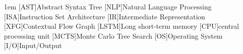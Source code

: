 \begin{acronym}[MCTS]\itemsep1em
    [AST]{Abstract Syntax Tree}
    [NLP]{Natural Language Processing}
    [ISA]{Instruction Set Architecture}
    [IR]{Intermediate Representation}
    [XFG]{Contextual Flow Graph}
    [LSTM]{Long short-term memory}
    [CPU]{central processing unit}
    [MCTS]{Monte Carlo Tree Search}
    [OS]{Operating System}
    [I/O]{Input/Output}
\end{acronym}
